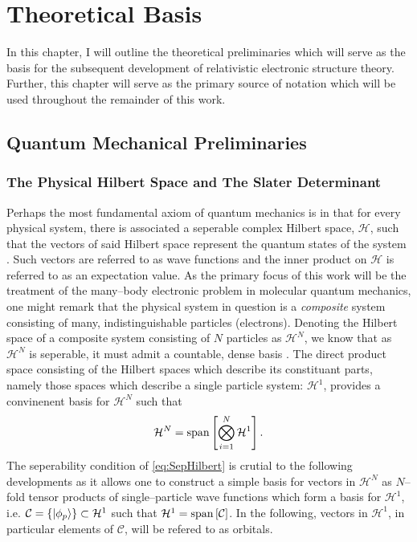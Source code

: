 \chapter{Theoretical Basis}
\label{ch:Theory}

In this chapter, I will outline the theoretical preliminaries which will serve as the basis
for the subsequent development of relativistic electronic structure theory. Further, this
chapter will serve as the primary source of notation which will be used throughout the
remainder of this work. 

\section{Quantum Mechanical Preliminaries}
\label{sec:QM}

\subsection{The Physical Hilbert Space and The Slater Determinant}
\label{sec:SD}

Perhaps the most fundamental axiom of quantum mechanics is in that for every physical
system, there is associated a seperable complex Hilbert space, $\mathcal{H}$, such that
the vectors of said Hilbert space represent the quantum states 
of the system \cite{VonNeumann55_book}. Such vectors are referred to as wave functions
and the inner product on $\mathcal{H}$ is referred to as an expectation value.
As the primary focus of this work will be the treatment of the many--body electronic
problem in molecular quantum mechanics, one might remark that the physical system
in question is a \emph{composite} system consisting of many, indistinguishable 
particles (electrons). Denoting the Hilbert space of a composite system consisting
of $N$ particles as $\mathcal{H}^N$, we know that as $\mathcal{H}^N$ is seperable,
it must admit a countable, dense basis \cite{Lee03_book}.
The direct product space consisting of the Hilbert spaces
which describe its constituant parts, namely those spaces which describe a
single particle system: $\mathcal{H}^1$, provides a convinenent basis for $\mathcal{H}^N$ such that
\begin{equation}
  \label{eq:SepHilbert}
  \mathcal{H}^N = \mathrm{span}\left[ \bigotimes_{i = 1}^N \mathcal{H}^1 \right].
\end{equation}
The seperability condition of \cref{eq:SepHilbert} is crutial to the following developments
as it allows one to construct a simple basis for vectors in $\mathcal{H}^N$
as $N$--fold tensor products of single--particle wave functions which form a basis for $\mathcal{H}^1$, 
i.e. $\mathcal{C} = \left \lbrace \left\vert \phi_p \right\rangle \right\rbrace  \subset \mathcal{H}^1$ such that 
$\mathcal{H}^1 = \mathrm{span}\left[ \mathcal{C} \right]$. In the following, vectors in $\mathcal{H}^1$, in particular elements of $\mathcal{C}$,
will be refered to as orbitals.

